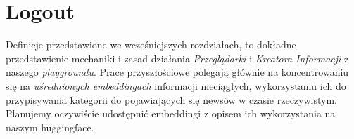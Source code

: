 \section{Logout}

Definicje przedstawione we wcześniejszych rozdziałach, to dokładne przedstawienie
mechaniki i zasad działania \textit{Przeglądarki} i \textit{Kreatora Informacji}
z naszego \textit{playgroundu}. Prace przyszłościowe polegają głównie na koncentrowaniu 
się na \textit{uśrednionych embeddingach} informacji nieciągłych, wykorzystaniu ich do przypisywania
kategorii do pojawiających się newsów w czasie rzeczywistym. Planujemy oczywiście
udostępnić embeddingi z opisem ich wykorzystania na naszym huggingface.
